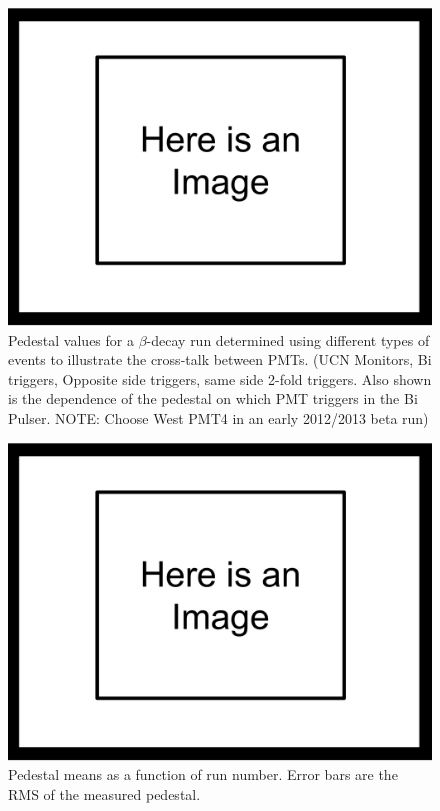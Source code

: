 \begin{figure}[h] \label{fig:peds_types}
\centering
\includegraphics[scale=.25]{3-UCNAAnalysis/ImageHolder.pdf}
\caption{Pedestal values for a $\beta$-decay run determined using different 
types of events to illustrate the cross-talk between PMTs. (UCN Monitors, 
Bi triggers, Opposite side triggers, same side 2-fold triggers. Also shown 
is the dependence of the pedestal on which PMT triggers in the Bi Pulser. NOTE:
Choose West PMT4 in an early 2012/2013 beta run) }
\end{figure}

\begin{figure}[h] \label{fig:peds_timeDep}
\centering
\includegraphics[scale=.25]{3-UCNAAnalysis/ImageHolder.pdf}
\caption{Pedestal means as a function of run number. Error bars are the
RMS of the measured pedestal. }
\end{figure}


